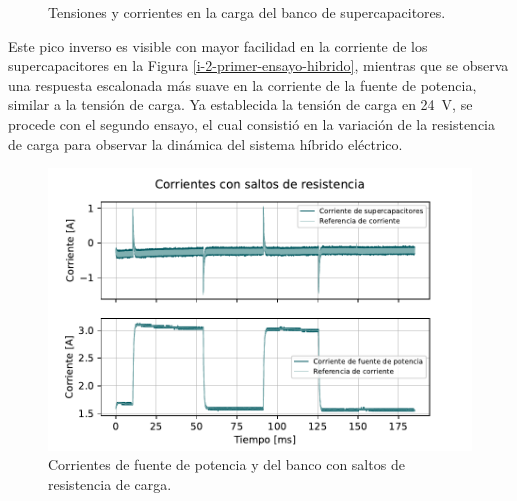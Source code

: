 \begin{figure}[hbt!]
  \centering
  \caption{Tensiones y corrientes en la carga del banco de supercapacitores.}
  \label{primer-ensayo-hibrido-2}
\end{figure}

Este pico inverso es visible con mayor facilidad en la corriente de los supercapacitores en la Figura \ref{i-2-primer-ensayo-hibrido}, mientras que se observa una respuesta escalonada más suave en la corriente de la fuente de potencia, similar a la tensión de carga. Ya establecida la tensión de carga en \SI{24}{\volt}, se procede con el segundo ensayo, el cual consistió en la variación de la resistencia de carga para observar la dinámica del sistema híbrido eléctrico.

\begin{figure}[hbt!]
  \centering
  \includegraphics[width=0.53\columnwidth]{Imágenes/Ensayos/Con módulos de almacenamiento/Supercapacitores/Con fuente de potencia/Segundo ensayo/Corrientes con saltos de resistencia.pdf}
  \caption{Corrientes de fuente de potencia y del banco con saltos de resistencia de carga.}
  \label{i-segundo-ensayo-hibrido}
\end{figure}

